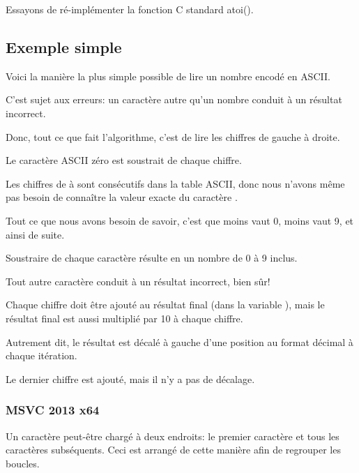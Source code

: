

Essayons de ré-implémenter la fonction C standard atoi().

\subsection{Exemple simple}

Voici la manière la plus simple possible de lire un nombre encodé en \ac{ASCII}.

C'est sujet aux erreurs: un caractère autre qu'un nombre conduit à un résultat incorrect.



Donc, tout ce que fait l'algorithme, c'est de lire les chiffres de gauche à droite.

Le caractère \ac{ASCII} zéro est soustrait de chaque chiffre.

Les chiffres de  à  sont consécutifs dans la table \ac{ASCII}, donc nous
n'avons même pas besoin de connaître la valeur exacte du caractère .

Tout ce que nous avons  besoin de savoir, c'est que  moins  vaut 0, 
moins  vaut 9, et ainsi de suite.

Soustraire  de chaque caractère résulte en un nombre de 0 à 9 inclus.

Tout autre caractère conduit à un résultat incorrect, bien sûr!

Chaque chiffre doit être ajouté au résultat final (dans la variable ), mais
le résultat final est aussi multiplié par 10 à chaque chiffre.

Autrement dit, le résultat est décalé à gauche d'une position au format décimal à
chaque itération.

Le dernier chiffre est ajouté, mais il n'y a pas de décalage.

\subsubsection{MSVC 2013 x64 \Optimizing}



Un caractère peut-être chargé à deux endroits: le premier caractère et tous les caractères subséquents.
Ceci est arrangé de cette manière afin de regrouper les boucles.

